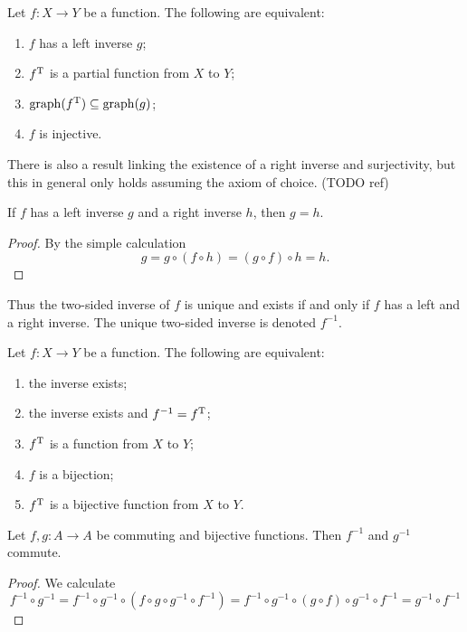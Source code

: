 \begin{lemma} \label{injectiveInverse}
Let $f:X\to Y$ be a function. The following are equivalent:
\begin{enumerate}
\item $f$ has a left inverse $g$;
\item $f^{\mathrm{T}}$ is a partial function from $X$ to $Y$; 
\item $\operatorname{graph}(f^{\mathrm{T}}) \subseteq \operatorname{graph}(g)$;
\item $f$ is injective.
\end{enumerate}
\end{lemma}
There is also a result linking the existence of a right inverse and surjectivity, but this in general only holds assuming the axiom of choice. (TODO ref)

\begin{lemma} \label{leftRightInverse}
If $f$ has a left inverse $g$ and a right inverse $h$, then $g=h$.
\end{lemma}
\begin{proof}
By the simple calculation
\[ g = g\circ (f\circ h) = (g\circ f) \circ h = h. \]
\end{proof}
Thus the two-sided inverse of $f$ is unique and exists \textup{if and only if} $f$ has a left and a right inverse. The unique two-sided inverse is denoted $f^{-1}$.

\begin{lemma}
Let $f:X\to Y$ be a function. The following are equivalent:
\begin{enumerate} 
\item the inverse exists;
\item the inverse exists and $f^{-1} = f^{\mathrm{T}}$;
\item $f^{\mathrm{T}}$ is a function from $X$ to $Y$;
\item $f$ is a bijection;
\item $f^{\mathrm{T}}$ is a bijective function from $X$ to $Y$.
\end{enumerate}
\end{lemma}

\begin{lemma} \label{commutationInverse}
Let $f, g:A\to A$ be commuting and bijective functions. Then $f^{-1}$ and $g^{-1}$ commute.
\end{lemma}
\begin{proof}
We calculate
\[ f^{-1}\circ g^{-1} = f^{-1}\circ g^{-1}\circ (f\circ g \circ g^{-1} \circ f^{-1}) = f^{-1}\circ g^{-1}\circ (g\circ f) \circ g^{-1} \circ f^{-1} = g^{-1} \circ f^{-1} \]
\end{proof}

